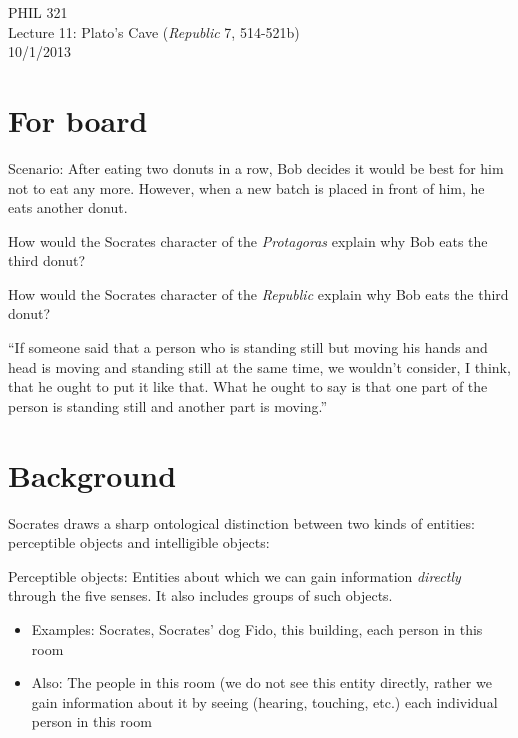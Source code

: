 \documentclass[11pt]{article}
\begin{document}
\thispagestyle{empty}
\begin{center} \LARGE{PHIL 321\\ Lecture 11: Plato's Cave (\emph{Republic} 7, 514-521b)}\\ \vspace*{2mm}
\large{10/1/2013}\end{center}
\thispagestyle{empty}\vspace*{3mm}
\vspace*{-8mm}

\section*{For board}

\noindent Scenario: After eating two donuts in a row, Bob decides it would be best for him not to eat any more. However, when a new batch is placed in front of him, he eats another donut.
\vspace*{2mm}

\noindent How would the Socrates character of the \emph{Protagoras} explain why Bob eats the third donut?
\vspace*{2mm}

\noindent How would the Socrates character of the \emph{Republic} explain why Bob eats the third donut?
\vspace*{2mm}

\noindent ``If someone said that a person who is standing still but moving his hands and head is moving and standing still at the same time, we wouldn't consider, I think, that he ought to put it like that. What he ought to say is that one part of the person is standing still and another part is moving.'' 

\section*{Background}

\noindent Socrates draws a sharp ontological distinction between two kinds of entities: perceptible objects and intelligible objects:
\vspace*{2mm}

\noindent Perceptible objects: Entities about which we can gain information \emph{directly} through the five senses. It also includes groups of such objects.
\begin{itemize}\item{Examples: Socrates, Socrates' dog Fido, this building, each person in this room}\item{Also: The people in this room (we do not see this entity directly, rather we gain information about it by seeing (hearing, touching, etc.) each individual person in this room}\end{itemize}
\end{document}
